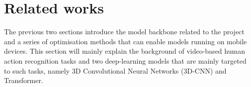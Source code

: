 \section{Related works}
\label{sec:Related works}
The previous two sections introduce the model backbone related to the project and a series of optimisation methods that can enable models running on mobile devices.
This section will mainly explain the background of video-based human action recognition tasks and two deep-learning models that are mainly targeted to such tasks, namely 3D Convolutional Neural Networks (3D-CNN) and Transformer.



